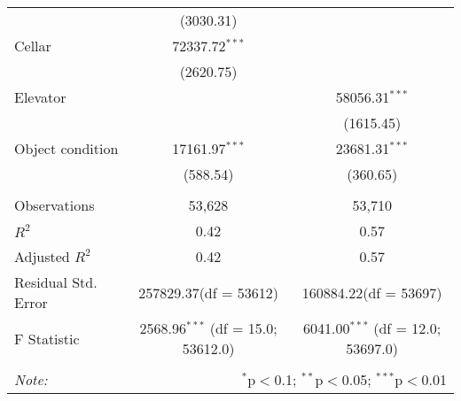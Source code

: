 \begin{table}[!htbp]
\begin{tabular}{@{\extracolsep{5pt}}lcc}
  & (3030.31) & \\
 Cellar & 72337.72$^{***}$ & \\
  & (2620.75) & \\
 Elevator & & 58056.31$^{***}$ \\
  & & (1615.45) \\
 Object condition & 17161.97$^{***}$ & 23681.31$^{***}$ \\
  & (588.54) & (360.65) \\
\hline \\[-1.8ex]
 Observations & 53,628 & 53,710 \\
 $R^2$ & 0.42 & 0.57 \\
 Adjusted $R^2$ & 0.42 & 0.57 \\
 Residual Std. Error & 257829.37(df = 53612) & 160884.22(df = 53697)  \\
 F Statistic & 2568.96$^{***}$ (df = 15.0; 53612.0) & 6041.00$^{***}$ (df = 12.0; 53697.0) \\
\hline
\hline \\[-1.8ex]
\textit{Note:} & \multicolumn{2}{r}{$^{*}$p$<$0.1; $^{**}$p$<$0.05; $^{***}$p$<$0.01} \\
\end{tabular}
\end{table}